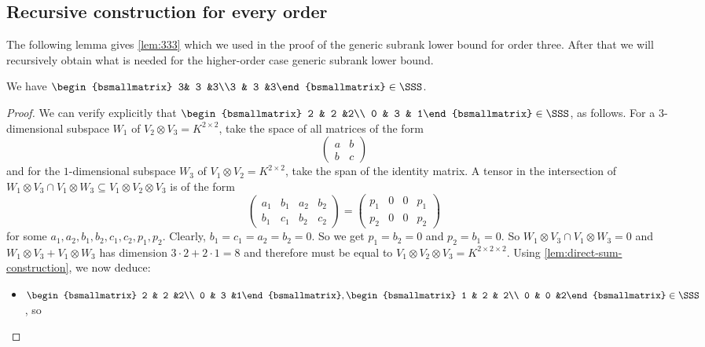\documentclass[11pt]{article}
\theoremstyle{definition}
\theoremstyle{remark}
\begin{document}
\subsection{Recursive construction for every order}

The following lemma gives \autoref{lem:333} which we used in the proof of the generic subrank lower bound for order three. After that we will recursively obtain what is needed for the higher-order case generic subrank lower bound.

\begin{lemma}\label{lem:333-333}
We have $\begin{bsmallmatrix} 3& 3 &3\\3 & 3 &3\end{bsmallmatrix}\in \SSS$.
\end{lemma}
\begin{proof}
We can verify explicitly that $\begin{bsmallmatrix} 2 & 2 &2\\ 0 & 3 & 1\end{bsmallmatrix}\in \SSS$, as follows.
For a $3$-dimensional subspace $W_1$ of $V_2\otimes V_3=K^{2\times 2}$, take the space of all matrices of the form
$$
\begin{pmatrix}
a & b\\
b & c
\end{pmatrix}
$$
and for the $1$-dimensional subspace $W_3$ of $V_1\otimes V_2=K^{2\times 2}$, take the span of the identity matrix. 
A tensor in the intersection of $W_1\otimes V_3\cap V_1\otimes W_3\subseteq V_1\otimes V_2\otimes V_3$ is of the form
$$
\left(
\begin{array}{cc|cc}
a_1 & b_1 & a_2 & b_2\\
b_1 & c_1 & b_2 & c_2
\end{array}
\right)= \left(\begin{array}{cc|cc}
p_1 & 0  & 0  & p_1\\
p_2 & 0  & 0 & p_2
\end{array}\right)
$$
for some $a_1,a_2,b_1,b_2,c_1,c_2,p_1,p_2$. Clearly, $b_1=c_1=a_2=b_2=0$. So we get $p_1=b_2=0$ and $p_2=b_1=0$.
So $W_1\otimes V_3\cap V_1\otimes W_3=0$ and $W_1\otimes V_3+V_1\otimes W_3$ has dimension
$3\cdot 2+2\cdot 1=8$ and therefore must be equal to $V_1\otimes V_2\otimes V_3=K^{2\times 2\times 2}$. Using \autoref{lem:direct-sum-construction},
we now deduce:
\begin{itemize}
\item $\begin{bsmallmatrix} 2 & 2 &2\\ 0 & 3 &1\end{bsmallmatrix}, \begin{bsmallmatrix} 1 & 2 & 2\\ 0 & 0 &2\end{bsmallmatrix}\in \SSS$, so

\end{itemize}
\end{proof}
\end{document}
